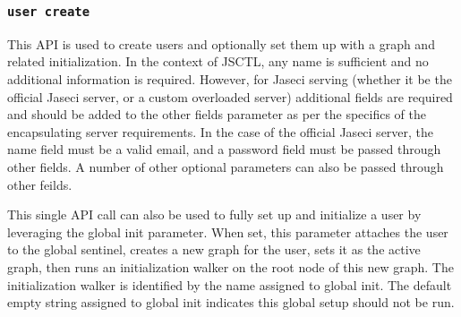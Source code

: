 \subsubsection{\lstinline[basicstyle=\Large\ttfamily]$user create$}

{This API is used to create users and optionally set them up with a graph and
related initialization. In the context of
JSCTL, any name is sufficient and no additional information is required.
However, for Jaseci serving (whether it be the official Jaseci server, or a
custom overloaded server) additional fields are required and should be added
to the other fields parameter as per the specifics of the encapsulating server
requirements. In the case of the official Jaseci server, the name field must
be a valid email, and a password field must be passed through other fields.
A number of other optional parameters can also be passed through other feilds.
\vspace{3mm}\par
This single API call can also be used to fully set up and initialize a user
by leveraging the global init parameter. When set, this parameter attaches the
user to the global sentinel, creates a new graph for the user, sets it as the
active graph, then runs an initialization walker on the root node of this new
graph. The initialization walker is identified by the name assigned to
global init. The default empty string assigned to global init indicates this
global setup should not be run.\vspace{4mm}\par
{}}
